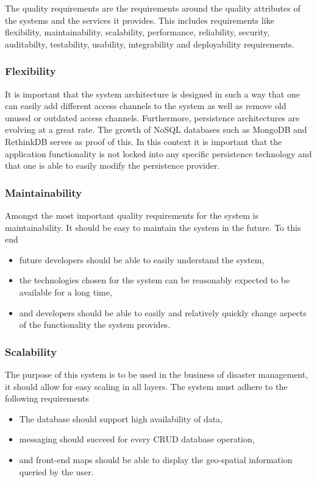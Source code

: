 The quality requirements are the requirements around the quality attributes of the systems and
the services it provides. This includes requirements like flexibility, maintainability, scalability, performance, reliability, security, auditabilty, testability, usability, integrability and deployability requirements.

\subsubsection{Flexibility}  
It is important that the system architecture is designed in such a way that one can easily add different access channels to the system as well as remove old unused or outdated access channels. Furthermore, persistence architectures are evolving at a great rate. The growth of NoSQL databases such as MongoDB and RethinkDB serves as proof of this. In this context it is important that the application functionality is not locked into any specific persistence technology and that one is able to easily modify the persistence provider.

\subsubsection{Maintainability}
Amongst the most important quality requirements for the system is maintainability. It should be easy to maintain the system in the future. To this end
\begin{itemize}
\item future developers should be able to easily understand the system,
\item the technologies chosen for the system can be reasonably expected to be available for a long time,
\item and developers should be able to easily and relatively quickly change aspects of the functionality the system provides.
\end{itemize}

\subsubsection{Scalability}
The purpose of this system is to be used in the business of disaster management, it should allow
for easy scaling in all layers. The system must adhere to the following requirements  
\begin{itemize}
\item The database should support high availability of data,
\item messaging should succeed for every CRUD database operation,
\item and front-end maps should be able to display the geo-spatial information queried by the user.
\end{itemize}

